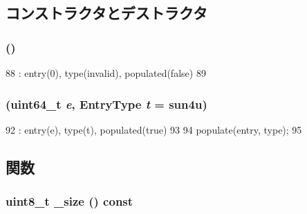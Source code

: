 \subsection{コンストラクタとデストラクタ}
\hypertarget{classSparcISA_1_1PageTableEntry_aed17530aff71992643e0f0280c7f9f59}{
\subsubsection[{PageTableEntry}]{ ()}}
\label{classSparcISA_1_1PageTableEntry_aed17530aff71992643e0f0280c7f9f59}



\begin{DoxyCode}
88                      : entry(0), type(invalid), populated(false)
89     {}
\end{DoxyCode}
\hypertarget{classSparcISA_1_1PageTableEntry_a4cd1402d0876ca3663d8664ca788f67b}{
\subsubsection[{PageTableEntry}]{ (uint64\_\-t {\em e}, \/  {\bf EntryType} {\em t} = {\ttfamily sun4u})}}
\label{classSparcISA_1_1PageTableEntry_a4cd1402d0876ca3663d8664ca788f67b}



\begin{DoxyCode}
92         : entry(e), type(t), populated(true)
93     {
94         populate(entry, type);
95     }
\end{DoxyCode}


\subsection{関数}
\hypertarget{classSparcISA_1_1PageTableEntry_a5bdbfa324a12a8bb02b6505e6a40a47f}{
\subsubsection[{\_\-size}]{\setlength{\rightskip}{0pt plus 5cm}uint8\_\-t \_\-size () const}}
\label{classSparcISA_1_1PageTableEntry_a5bdbfa324a12a8bb02b6505e6a40a47f}



